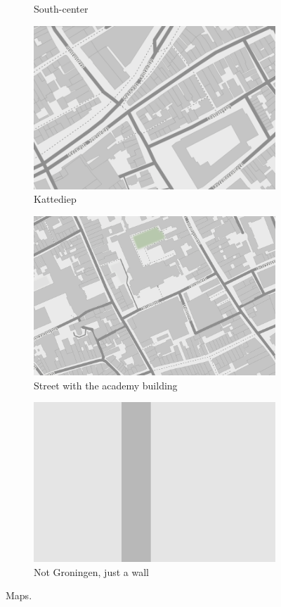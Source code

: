 \begin{figure}[htbp]
\begin{center}
\begin{subfigure}{.5\textwidth}
\caption{South-center}
\end{subfigure}%
\begin{subfigure}{.5\textwidth}
\includegraphics[width=0.8\linewidth]{../experiments/GroteMarktMaps/maps/kattediep.png}
\caption{Kattediep}
\end{subfigure}
\begin{subfigure}{.5\textwidth}
\includegraphics[width=0.8\linewidth]{../experiments/GroteMarktMaps/maps/academy.png}
\caption{Street with the academy building}
\end{subfigure}%
\begin{subfigure}{.5\textwidth}
\includegraphics[width=0.8\linewidth]{../experiments/GroteMarktMaps/maps/wall.png}
\caption{Not Groningen, just a wall}
\end{subfigure}
\caption{Maps.}
\label{maps}
\end{center}
\end{figure}


